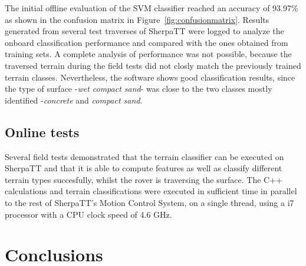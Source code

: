 \documentclass{article}
\begin{document}

The initial offline evaluation of the SVM classifier reached an accuracy of 93.97\% as shown in the confusion matrix in Figure~\ref{fig:confusionmatrix}.
Results generated from several test traverses of SherpaTT were logged to analyze the onboard classification performance and compared with the ones obtained from training sets. A complete analysis of performance was not possible, because the traversed terrain during the field tests did not closly match the previously trained terrain classes. Nevertheless, the software shows good classification results, since the type of surface -\emph{wet compact sand}- was close to the two classes mostly identified -\emph{concrete} and \emph{compact sand}.

\subsection{Online tests}
Several field tests demonstrated that the terrain classifier can be executed on SherpaTT and that it is able to compute features as well as classify different terrain types succesfully, whilst the rover is traversing the surface. The C++ calculations and terrain classifications were executed in sufficient time in parallel to the rest of SherpaTT's Motion Control System, on a single thread, using a i7 processor with a CPU clock speed of 4.6 GHz. 


\section{Conclusions}


\FloatBarrier



\end{document}
